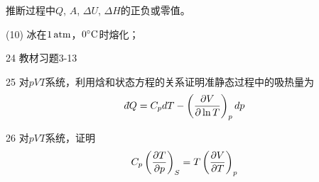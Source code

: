\documentclass[CJK]{beamer}
\begin{document}
\begin{frame}
\bch


推断过程中$Q$, $A$, $\Delta U$, $\Delta H$的正负或零值。

\bitem
\item[(10)]{冰在$1\,\mathrm{atm}$，$0^\circ \mathrm{C}$时熔化；}
\eitem

\ech
\end{frame}


\begin{frame}
\bch
\bitem
\item[24]{ 教材习题3-13}
\item[25]{ 对$pVT$系统，利用焓和状态方程的关系证明准静态过程中的吸热量为
$$ \dbar Q = C_p dT - \pfrac V{\ln T}p dp$$}
\item[26]{ 对$pVT$系统，证明
$$C_p \left(\frac{\partial T}{\partial p}\right)_{S} = T \left(\frac{\partial V}{\partial T}\right)_{p} $$ }
\eitem
\ech
\end{frame}
\end{document}

